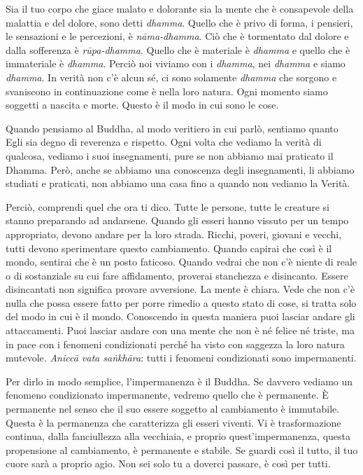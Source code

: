 Sia il tuo corpo che giace malato e dolorante sia la mente che è
consapevole della malattia e del dolore, sono detti \emph{dhamma}.
Quello che è privo di forma, i pensieri, le sensazioni e le percezioni,
è \emph{nāma-dhamma}. Ciò che è tormentato dal dolore e dalla sofferenza
è \emph{rūpa-dhamma}. Quello che è materiale è \emph{dhamma} e quello
che è immateriale è \emph{dhamma}. Perciò noi viviamo con i
\emph{dhamma}, nei \emph{dhamma} e siamo \emph{dhamma}. In verità non
c'è alcun sé, ci sono solamente \emph{dhamma} che sorgono e svaniscono
in continuazione come è nella loro natura. Ogni momento siamo soggetti a
nascita e morte. Questo è il modo in cui sono le cose.

Quando pensiamo al Buddha, al modo veritiero in cui parlò, sentiamo
quanto Egli sia degno di reverenza e rispetto. Ogni volta che vediamo la
verità di qualcosa, vediamo i suoi insegnamenti, pure se non abbiamo mai
praticato il Dhamma. Però, anche se abbiamo una conoscenza degli
insegnamenti, li abbiamo studiati e praticati, non abbiamo una casa fino
a quando non vediamo la Verità.

Perciò, comprendi quel che ora ti dico. Tutte le persone, tutte le
creature si stanno preparando ad andarsene. Quando gli esseri hanno
vissuto per un tempo appropriato, devono andare per la loro strada.
Ricchi, poveri, giovani e vecchi, tutti devono sperimentare questo
cambiamento. Quando capirai che così è il mondo, sentirai che è un posto
faticoso. Quando vedrai che non c'è niente di reale o di sostanziale su
cui fare affidamento, proverai stanchezza e disincanto. Essere
disincantati non significa provare avversione. La mente è chiara. Vede
che non c'è nulla che possa essere fatto per porre rimedio a questo
stato di cose, si tratta solo del modo in cui è il mondo. Conoscendo in
questa maniera puoi lasciar andare gli attaccamenti. Puoi lasciar andare
con una mente che non è né felice né triste, ma in pace con i fenomeni
condizionati perché ha visto con saggezza la loro natura mutevole.
\emph{Aniccā vata saṅkhāra}: tutti i fenomeni condizionati sono
impermanenti.

Per dirlo in modo semplice, l'impermanenza è il Buddha. Se davvero
vediamo un fenomeno condizionato impermanente, vedremo quello che è
permanente. È permanente nel senso che il suo essere soggetto al
cambiamento è immutabile. Questa è la permanenza che caratterizza gli
esseri viventi. Vi è trasformazione continua, dalla fanciullezza alla
vecchiaia, e proprio quest'impermanenza, questa propensione al
cambiamento, è permanente e stabile. Se guardi così il tutto, il tuo
cuore sarà a proprio agio. Non sei solo tu a doverci passare, è così per
tutti.

